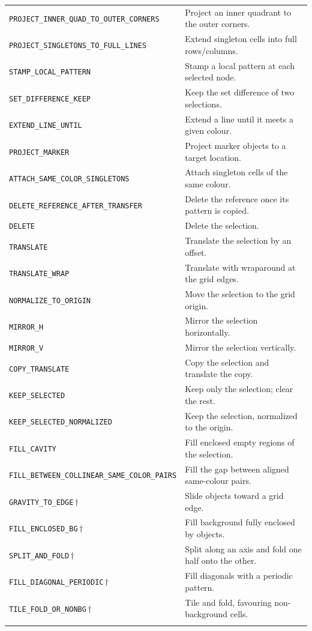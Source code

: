 \begin{table}[htbp]
\begin{tabular}{p{6.9cm}p{6.1cm}}
\texttt{PROJECT\_INNER\_QUAD\_TO\_OUTER\_CORNERS} & Project an inner quadrant to the outer corners. \\
\texttt{PROJECT\_SINGLETONS\_TO\_FULL\_LINES} & Extend singleton cells into full rows/columns. \\
\texttt{STAMP\_LOCAL\_PATTERN} & Stamp a local pattern at each selected node. \\
\texttt{SET\_DIFFERENCE\_KEEP} & Keep the set difference of two selections. \\
\texttt{EXTEND\_LINE\_UNTIL} & Extend a line until it meets a given colour. \\
\texttt{PROJECT\_MARKER} & Project marker objects to a target location. \\
\texttt{ATTACH\_SAME\_COLOR\_SINGLETONS} & Attach singleton cells of the same colour. \\
\texttt{DELETE\_REFERENCE\_AFTER\_TRANSFER} & Delete the reference once its pattern is copied. \\
\texttt{DELETE} & Delete the selection. \\
\texttt{TRANSLATE} & Translate the selection by an offset. \\
\texttt{TRANSLATE\_WRAP} & Translate with wraparound at the grid edges. \\
\texttt{NORMALIZE\_TO\_ORIGIN} & Move the selection to the grid origin. \\
\texttt{MIRROR\_H} & Mirror the selection horizontally. \\
\texttt{MIRROR\_V} & Mirror the selection vertically. \\
\texttt{COPY\_TRANSLATE} & Copy the selection and translate the copy. \\
\texttt{KEEP\_SELECTED} & Keep only the selection; clear the rest. \\
\texttt{KEEP\_SELECTED\_NORMALIZED} & Keep the selection, normalized to the origin. \\
\texttt{FILL\_CAVITY} & Fill enclosed empty regions of the selection. \\
\texttt{FILL\_BETWEEN\_COLLINEAR\_SAME\_COLOR\_PAIRS} & Fill the gap between aligned same-colour pairs. \\
\texttt{GRAVITY\_TO\_EDGE}\,$\dagger$ & Slide objects toward a grid edge. \\
\texttt{FILL\_ENCLOSED\_BG}\,$\dagger$ & Fill background fully enclosed by objects. \\
\texttt{SPLIT\_AND\_FOLD}\,$\dagger$ & Split along an axis and fold one half onto the other. \\
\texttt{FILL\_DIAGONAL\_PERIODIC}\,$\dagger$ & Fill diagonals with a periodic pattern. \\
\texttt{TILE\_FOLD\_OR\_NONBG}\,$\dagger$ & Tile and fold, favouring non-background cells. \\
\noalign{\smallskip}\hline
\end{tabular}
\end{table}

